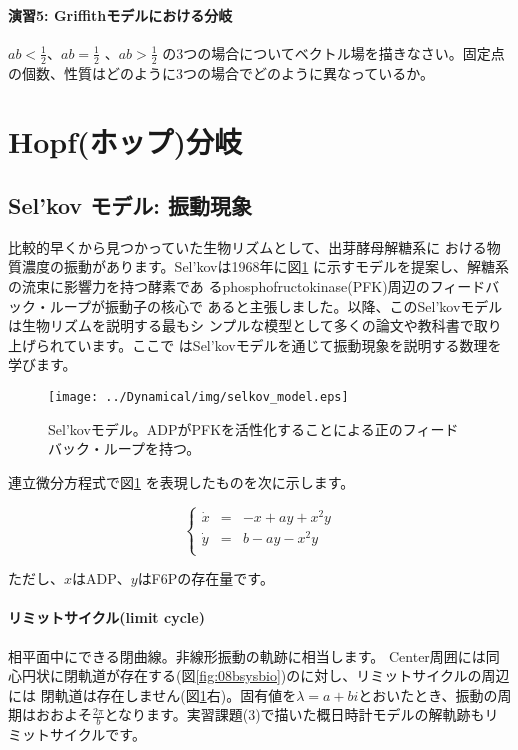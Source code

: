 \paragraph{演習5:  Griffithモデルにおける分岐}
\(ab < \displaystyle\frac{1}{2}\)、\(ab=\displaystyle\frac{1}{2}\) 、\(ab > \displaystyle\frac{1}{2}\) の3つの場合についてベクトル場を描きなさい。固定点の個数、性質はどのように3つの場合でどのように異なっているか。


\section{Hopf(ホップ)分岐}

\def\演習問題#1{{\flushleft\underline{\bf 演習問題~#1}}}

%
\subsection{Sel'kov モデル: 振動現象}
\indent 比較的早くから見つかっていた生物リズムとして、出芽酵母解糖系に
おける物質濃度の振動があります。Sel'kovは1968年に図\ref{fig:09sysbio}
に示すモデルを提案し、解糖系の流束に影響力を持つ酵素であ
るphosphofructokinase(PFK)周辺のフィードバック・ループが振動子の核心で
あると主張しました。以降、このSel'kovモデルは生物リズムを説明する最もシ
ンプルな模型として多くの論文や教科書で取り上げられています。ここで
はSel'kovモデルを通じて振動現象を説明する数理を学びます。

\begin{figure}[ht]
        \centering \texttt{[image: ../Dynamical/img/selkov\_model.eps]}
        \caption{Sel'kovモデル。ADPがPFKを活性化することによる正のフィードバック・ループを持つ。}
        \label{fig:09sysbio} \end{figure}

連立微分方程式で図\ref{fig:09sysbio} を表現したものを次に示します。

\[
\left\{
\begin{array}{lclclll}
\dot x & = & -x+ay+x^2 y\\
\dot y & = & b-ay-x^2y\\
\end{array}
\right.\]

ただし、\(x\)はADP、\(y\)はF6Pの存在量です。

\paragraph{リミットサイクル(limit cycle)} 相平面中にできる閉曲線。非線形振動の軌跡に相当します。
Center周囲には同心円状に閉軌道が存在する(図\ref{fig:08bsysbio})のに対し、リミットサイクルの周辺には
閉軌道は存在しません(図\ref{fig:09sysbio}右)。固有値を\(\lambda = a+bi\)とおいたとき、振動の周期はおおよそ\(\displaystyle\frac{2\pi}{b}\)となります。実習課題(3)で描いた概日時計モデルの解軌跡もリミットサイクルです。

